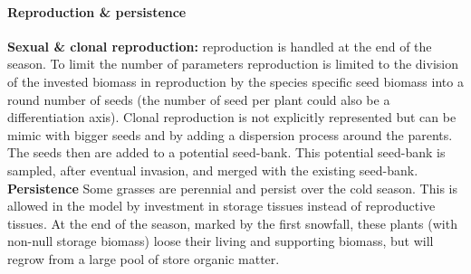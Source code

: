 \paragraph{Reproduction \& persistence}
\textbf{Sexual \& clonal reproduction:} reproduction is handled at the end of the season. To limit the number of parameters reproduction is limited to the division of the invested biomass in reproduction by the species specific seed biomass into a round number of seeds (the number of seed per plant could also be a differentiation axis). Clonal reproduction is not explicitly represented but can be mimic with bigger seeds and by adding a dispersion process around the parents. The seeds then are added to a potential seed-bank. This potential seed-bank is sampled, after eventual invasion, and merged with the existing seed-bank.\\

\textbf{Persistence} Some grasses are perennial and persist over the cold season. This is allowed in the model by investment in storage tissues instead of reproductive tissues.  At the end of the season, marked by the first snowfall, these plants (with non-null storage biomass) loose their living and supporting biomass, but will regrow from a large pool of store organic matter.

